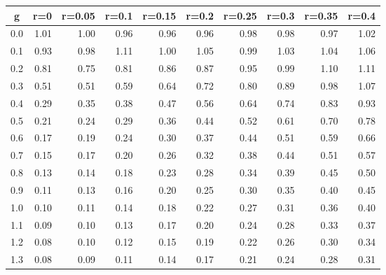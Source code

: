 %
\begin{table}[!tbp]
 \begin{center}
 \begin{tabular}{rrrrrrrrrr}\hline\hline
\multicolumn{1}{c}{g}&\multicolumn{1}{c}{r=0}&\multicolumn{1}{c}{r=0.05}&\multicolumn{1}{c}{r=0.1}&\multicolumn{1}{c}{r=0.15}&\multicolumn{1}{c}{r=0.2}&\multicolumn{1}{c}{r=0.25}&\multicolumn{1}{c}{r=0.3}&\multicolumn{1}{c}{r=0.35}&\multicolumn{1}{c}{r=0.4}\tabularnewline
\hline
0.0&1.01&1.00&0.96&0.96&0.96&0.98&0.98&0.97&1.02\tabularnewline
0.1&0.93&0.98&1.11&1.00&1.05&0.99&1.03&1.04&1.06\tabularnewline
0.2&0.81&0.75&0.81&0.86&0.87&0.95&0.99&1.10&1.11\tabularnewline
0.3&0.51&0.51&0.59&0.64&0.72&0.80&0.89&0.98&1.07\tabularnewline
0.4&0.29&0.35&0.38&0.47&0.56&0.64&0.74&0.83&0.93\tabularnewline
0.5&0.21&0.24&0.29&0.36&0.44&0.52&0.61&0.70&0.78\tabularnewline
0.6&0.17&0.19&0.24&0.30&0.37&0.44&0.51&0.59&0.66\tabularnewline
0.7&0.15&0.17&0.20&0.26&0.32&0.38&0.44&0.51&0.57\tabularnewline
0.8&0.13&0.14&0.18&0.23&0.28&0.34&0.39&0.45&0.50\tabularnewline
0.9&0.11&0.13&0.16&0.20&0.25&0.30&0.35&0.40&0.45\tabularnewline
1.0&0.10&0.11&0.14&0.18&0.22&0.27&0.31&0.36&0.40\tabularnewline
1.1&0.09&0.10&0.13&0.17&0.20&0.24&0.28&0.33&0.37\tabularnewline
1.2&0.08&0.10&0.12&0.15&0.19&0.22&0.26&0.30&0.34\tabularnewline
1.3&0.08&0.09&0.11&0.14&0.17&0.21&0.24&0.28&0.31\tabularnewline
\hline
\end{tabular}

\end{center}

\end{table}

